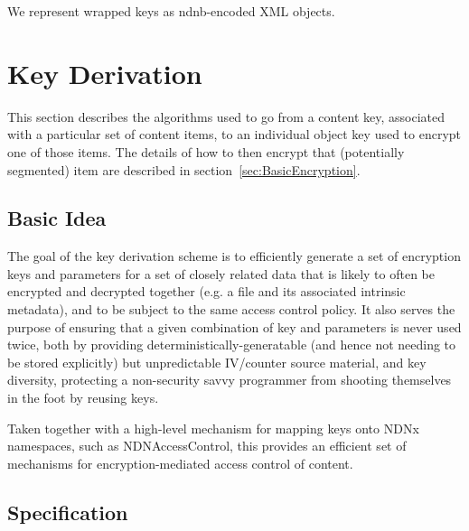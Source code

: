 We represent wrapped keys as ndnb-encoded XML objects. 

\newpage

\section{Key Derivation}
\label{sec:KeyDerivation}

This section describes the algorithms used to go from a content key,
associated with a particular set of content items, to an individual
object key used to encrypt one of those items. The details of how to
then encrypt that (potentially segmented) item are described in
section~\ref{sec:BasicEncryption}.

\subsection{Basic Idea}

The goal of the key derivation scheme is to efficiently generate a set
of encryption keys and parameters for a set of closely related data
that is likely to often be encrypted and decrypted together (e.g. a
file and its associated intrinsic metadata), and to be subject to the
same access control policy. It also serves the purpose of ensuring
that a given combination of key and parameters is never used twice,
both by providing deterministically-generatable (and hence not needing
to be stored explicitly) but unpredictable IV/counter source material,
and key diversity, protecting a non-security savvy programmer from
shooting themselves in the foot by reusing keys.

Taken together with a high-level mechanism for mapping keys onto NDNx
namespaces, such as NDNAccessControl, this provides an efficient set
of mechanisms for encryption-mediated access control of content.

\subsection{Specification}

